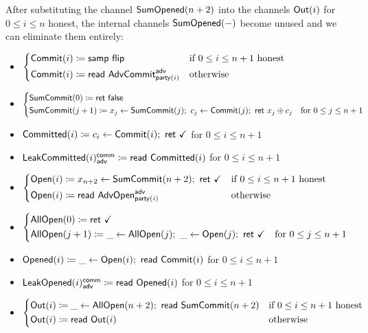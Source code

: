 \noindent After substituting the channel $\mathsf{SumOpened}(n+2)$ into the channels $\mathsf{Out}(i)$ for $0 \leq i \leq n$ honest, the internal channels $\mathsf{SumOpened}(-)$ become unused and we can eliminate them entirely:

\begin{itemize}
\item {\color{blue} $\begin{cases*} \Commit(i) \coloneqq \samp{\flip} & \text{if $0 \leq i \leq n+1$ honest} \\ \Commit(i) \coloneqq \read{\AdvCommit^\adv_{\party(i)}} & \text{otherwise} \end{cases*}$}
\item {\color{blue} $\begin{cases*} \SumCommit(0) \coloneqq \ret{\false} & \\ \SumCommit(j+1) \coloneqq x_j \leftarrow \SumCommit(j); \ c_j \leftarrow \Commit(j); \ \ret{x_j \oplus c_j} & \text{for $0 \leq j \leq n+1$} \end{cases*}$}
\item {\color{magenta} $\mathsf{Committed}(i) \coloneqq c_i \leftarrow \mathsf{Commit}(i); \ \mathsf{ret} \ \checkmark$ for $0 \leq i \leq n+1$}
\item {\color{magenta} $\mathsf{LeakCommitted}(i)^{\mathsf{comm}}_{\mathsf{adv}} \coloneqq \mathsf{read} \ \mathsf{Committed}(i)$ for $0 \leq i \leq n+1$}
\item {\color{teal} $\begin{cases*} \Open(i) \coloneqq x_{n+2} \leftarrow \SumCommit(n+2); \ \ret{\checkmark} & \text{if $0 \leq i \leq n+1$ honest} \\ \Open(i) \coloneqq \read{\AdvOpen^\adv_{\party(i)}} & \text{otherwise} \end{cases*}$}
\item {\color{teal} $\begin{cases*} \AllOpen(0) \coloneqq \ret{\checkmark} & \\ \AllOpen(j+1) \coloneqq \_ \leftarrow \AllOpen(j); \ \_ \leftarrow \Open(j); \ \ret{\checkmark} & \text{for $0 \leq j \leq n+1$} \end{cases*}$}
\item {\color{red} $\mathsf{Opened}(i) \coloneqq \_ \leftarrow \mathsf{Open}(i); \ \mathsf{read} \ \mathsf{Commit}(i)$ for $0 \leq i \leq n+1$}
\item {\color{red} $\mathsf{LeakOpened}(i)^{\mathsf{comm}}_{\mathsf{adv}} \coloneqq \mathsf{read} \ \mathsf{Opened}(i)$ for $0 \leq i \leq n+1$}
\item $\begin{cases*} \Out(i) \coloneqq \_ \leftarrow \AllOpen(n+2); \ \read{\SumCommit(n+2)} & \text{if $0 \leq i \leq n+1$ honest} \\ \Out(i) \coloneqq \read{\Out(i)} & \text{otherwise} \end{cases*}$
\end{itemize}

